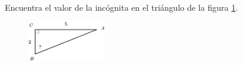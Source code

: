 Encuentra el valor de la incógnita en el triángulo de la figura \ref{fig:angle_functrig_22}.
\begin{figure}[H]
    \begin{center}
        \includegraphics[width=0.3\textwidth]{../images/angle_functrig_22.png}
    \end{center}
    \caption{}
    \label{fig:angle_functrig_22}
\end{figure}